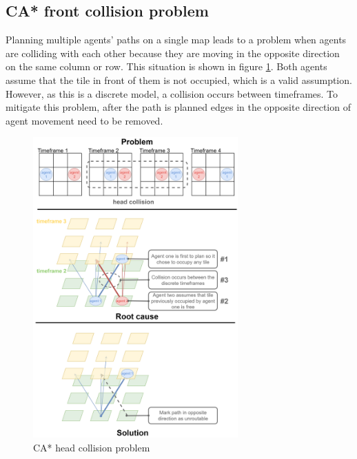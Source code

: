 \subsection{CA* front collision problem}
Planning multiple agents' paths on a single map leads to a problem when agents are colliding with each other because they are moving in the opposite direction on the same column or row. This situation is shown in figure \ref{fig:head_collision}. Both agents assume that the tile in front of them is not occupied, which is a valid assumption. However, as this is a discrete model, a collision occurs between timeframes. To mitigate this problem, after the path is planned edges in the opposite direction of agent movement need to be removed.
\begin{figure}[H]
    \centering
    \includegraphics[width=0.7\textwidth]{pictures/head_collision_problem.png}
    \caption{ CA* head collision problem}
    \label{fig:head_collision}
\end{figure}